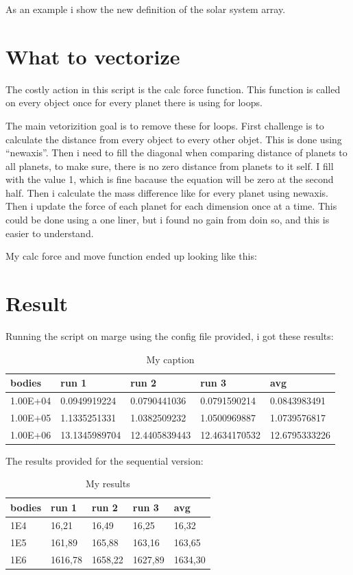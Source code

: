 \documentclass{Article}
\begin{document}
As an example i show the new definition of the solar system array.


\section{What to vectorize}
The costly action in this script is the calc force function. This function is called on every object once for every planet there is using for loops. 

The main vetorizition goal is to remove these for loops. First challenge is to calculate the distance from every object to every other objet. This is done using ``newaxis''.
Then i need to fill the diagonal when comparing distance of planets to all planets, to make sure, there is no zero distance from planets to it self. I fill with the value 1, which is fine bacause the equation will be zero at the second half.
Then i calculate the mass difference like for every planet using newaxis.
Then i update the force of each planet for each dimension once at a time. This could be done using a one liner, but i found no gain from doin so, and this is easier to understand.

My calc force and move function ended up looking like this:



\section{Result}
Running the script on marge using the config file provided, i got these results:

\begin{table}[h!]
\centering
\caption{My caption}
\label{my-label}
\begin{tabular}{|l|l|l|l|l|}
\hline
bodies   & run 1         & run 2         & run 3         & avg           \\ \hline
1.00E+04 & 0.0949919224  & 0.0790441036  & 0.0791590214  & 0.0843983491  \\ \hline
1.00E+05 & 1.1335251331  & 1.0382509232  & 1.0500969887  & 1.0739576817  \\ \hline
1.00E+06 & 13.1345989704 & 12.4405839443 & 12.4634170532 & 12.6795333226 \\ \hline
\end{tabular}
\end{table}
The results provided for the sequential version:
\begin{table}[h!]
\centering
\caption{My results}
\label{my-label}
\begin{tabular}{|l|l|l|l|l|}
\hline
bodies   & run 1        & run 2        & run 3        & avg         \\ \hline
1E4 & 16,21 & 16,49 & 16,25 & 16,32 \\ \hline
1E5 & 161,89  & 165,88  & 163,16  & 163,65 \\ \hline
1E6 & 1616,78  & 1658,22  & 1627,89   & 1634,30 \\ \hline
\end{tabular}
\end{table}
\end{document}
